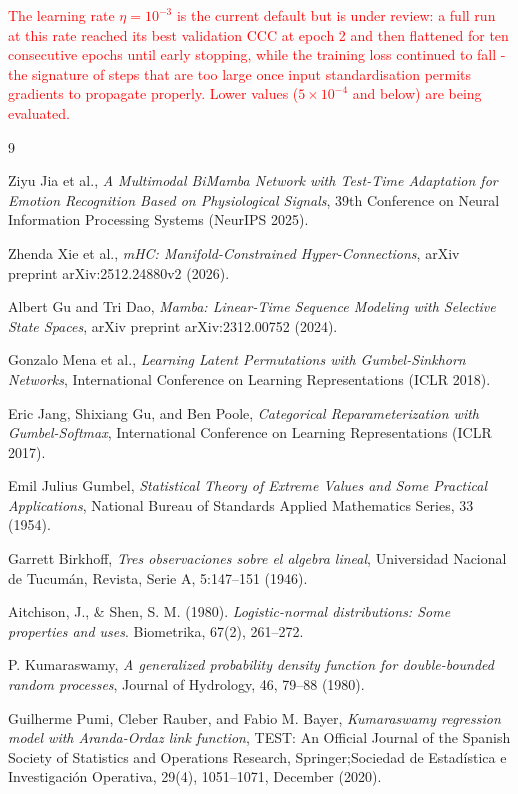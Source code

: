 \documentclass[11pt,a4paper]{article}
\begin{document}
	\textcolor{red}{The learning rate $\eta = 10^{-3}$ is the current default but is under review: a full run at this rate reached its best validation CCC at epoch 2 and then flattened for ten consecutive epochs until early stopping, while the training loss continued to fall - the signature of steps that are too large once input standardisation permits gradients to propagate properly. Lower values ($5\times10^{-4}$ and below) are being evaluated.}

	\newpage
	\begin{thebibliography}{9}
		
		Ziyu Jia et al., \emph{A Multimodal BiMamba Network with Test-Time Adaptation for Emotion Recognition Based on Physiological Signals}, 39th Conference on Neural Information Processing Systems (NeurIPS 2025).
		
		Zhenda Xie et al., \emph{mHC: Manifold-Constrained Hyper-Connections}, arXiv preprint arXiv:2512.24880v2 (2026).
		
		Albert Gu and Tri Dao, \emph{Mamba: Linear-Time Sequence Modeling with Selective State Spaces}, arXiv preprint arXiv:2312.00752 (2024).
		
		Gonzalo Mena et al., \emph{Learning Latent Permutations with Gumbel-Sinkhorn Networks}, International Conference on Learning Representations (ICLR 2018).
		
		Eric Jang, Shixiang Gu, and Ben Poole, \emph{Categorical Reparameterization with Gumbel-Softmax}, International Conference on Learning Representations (ICLR 2017).
		
		Emil Julius Gumbel, \emph{Statistical Theory of Extreme Values and Some Practical Applications}, National Bureau of Standards Applied Mathematics Series, 33 (1954).
		
		Garrett Birkhoff, \emph{Tres observaciones sobre el algebra lineal}, Universidad Nacional de Tucum\'{a}n, Revista, Serie A, 5:147--151 (1946).
		
		Aitchison, J., \& Shen, S. M. (1980). \emph{Logistic-normal distributions: Some properties and uses}. Biometrika, 67(2), 261--272.
		
		P. Kumaraswamy, \emph{A generalized probability density function for double-bounded random processes}, Journal of Hydrology, 46, 79--88 (1980).
		
		Guilherme Pumi, Cleber Rauber, and Fabio M. Bayer, \emph{Kumaraswamy regression model with Aranda-Ordaz link function}, TEST: An Official Journal of the Spanish Society of Statistics and Operations Research, Springer;Sociedad de Estadística e Investigación Operativa, 29(4), 1051--1071, December (2020).
		

\end{thebibliography}
\end{document}
